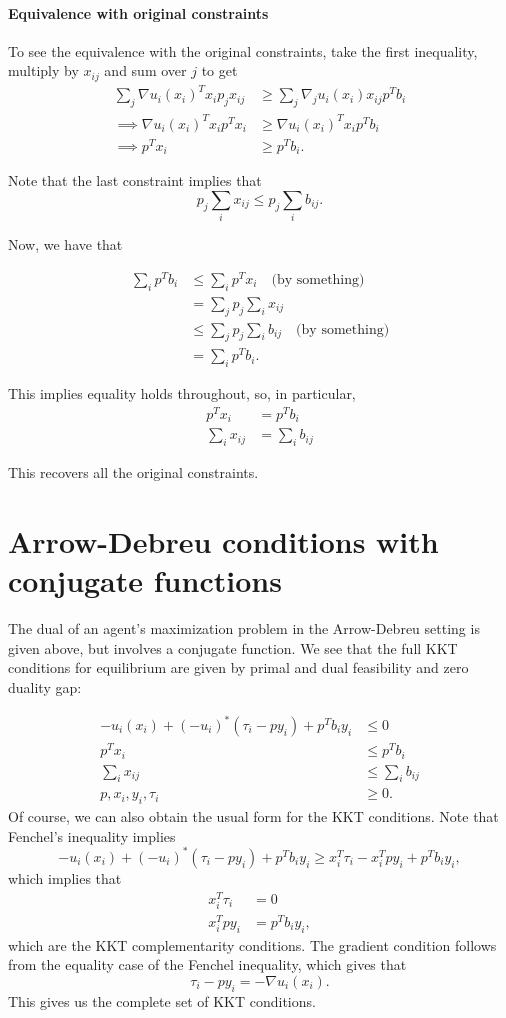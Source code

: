 \documentclass[12pt]{article}
\begin{document}
\paragraph{Equivalence with original constraints}
To see the equivalence with the original constraints, take the first inequality,
multiply by $x_{ij}$ and sum over $j$ to get
\begin{align*}
\sum_j \nabla u_i(x_i)^T x_i p_j x_{ij} &\geq \sum_j \nabla_j u_i(x_i) x_{ij} p^T b_i \\
\implies \nabla u_i(x_i)^T x_i p^T x_i &\geq \nabla u_i(x_i)^T x_i p^T b_i \\
\implies p^T x_i &\geq p^T b_i.
\end{align*}

Note that the last constraint implies that
\[
p_j \sum_i x_{ij} \leq p_j \sum_i b_{ij}.
\]

Now, we have that

\begin{align*}
\sum_i p^T b_i &\leq \sum_i p^T x_i\quad \text{(by something)}\\
&= \sum_j p_j \sum_i x_{ij} \\
&\leq \sum_j p_j \sum_i b_{ij}\quad \text{(by something)}\\
&= \sum_i p^T b_i.
\end{align*}

This implies equality holds throughout, so, in particular,
\begin{align*}
p^T x_i &= p^T b_i\\
\sum_i x_{ij} &= \sum_i b_{ij}
\end{align*}

This recovers all the original constraints.

\section{Arrow-Debreu conditions with conjugate functions}
The dual of an agent's maximization problem in the Arrow-Debreu setting
is given above, but involves a conjugate function.
We see that the full KKT conditions for equilibrium are given by
primal and dual feasibility and zero duality gap:

\begin{align*}
-u_i(x_i) + (-u_i)^*(\tau_i - p y_i) + p^T b_i y_i &\leq 0\\
p^T x_i &\leq p^T b_i \\
\sum_i x_{ij} &\leq \sum_i b_{ij}\\
p, x_i, y_i, \tau_i &\geq 0.
\end{align*}
Of course, we can also obtain the usual form for the KKT conditions.
Note that Fenchel's inequality implies
\[
-u_i(x_i) + (-u_i)^*(\tau_i - p y_i) + p^T b_i y_i
\geq x_i^T \tau_i - x_i^T p y_i + p^T b_i y_i,
\]
which implies that
\begin{align*}
x_i^T \tau_i &= 0\\
x_i^T p y_i &= p^T b_i y_i,
\end{align*}
which are the KKT complementarity conditions.
The gradient condition follows from the equality case of the Fenchel inequality,
which gives that
\[
\tau_i - p y_i = - \nabla u_i(x_i).
\]
This gives us the complete set of KKT conditions.
\end{document}
